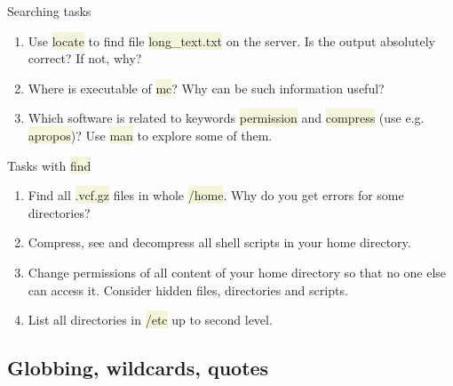 \documentclass[compress, xelatex, 11pt, xcolor=svgnames, aspectratio=169,
	hyperref={
		bookmarks=true,
		unicode=true,
		colorlinks=true,
		pdftitle={Linux, command line and MetaCentrum},
		plainpages=false,
		pdfauthor={Vojtech Zeisek},
		pdfsubject={Course about use of Linux command line, writing shell scripts and using MetaCentrum of CESNET},
		pdfcreator={XeLaTeX},
		pdfkeywords={Linux, GNU, BASH, shell, command line, MetaCentrum},
		linkcolor=DarkRed, %
		anchorcolor=DarkBlue, %
		citecolor=Indigo, %
		filecolor=NavyBlue, %
		menucolor=DarkMagenta, %
		urlcolor=DarkBlue, %
		},
	url={hyphens, lowtilde} %
	]{beamer}
\renewcommand{\texttt}[1]{\colorbox{Beige}{{\ttfamily #1}}}
\begin{document}
\begin{frame}{Searching tasks}
	\begin{enumerate}
		\item Use \texttt{locate} to find file \texttt{long\_text.txt} on the server. Is the output absolutely correct? If not, why?
		\item Where is executable of \texttt{mc}? Why can be such information useful?
		\item Which software is related to keywords \texttt{permission} and \texttt{compress} (use e.g. \texttt{apropos})? Use \texttt{man} to explore some of them.
	\end{enumerate}
	\begin{block}{Tasks with \texttt{find}} %
		\begin{enumerate}
			\item Find all \texttt{*.vcf.gz} files in whole \texttt{/home}. Why do you get errors for some directories?
			\item Compress, see and decompress all shell scripts in your home directory.
			\item Change permissions of all content of your home directory so that no one else can access it. Consider hidden files, directories and scripts.
			\item List all directories in \texttt{/etc} up to second level.
		\end{enumerate}
	\end{block}
\end{frame}

\subsection{Globbing, wildcards, quotes}
\end{document}
